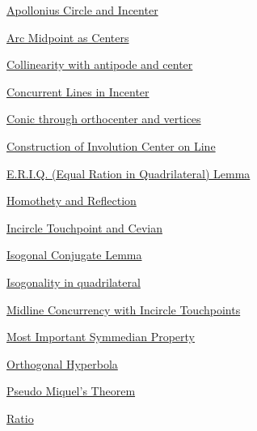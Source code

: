 \hyperref  [lemma:]{}

\hyperref  [lemma:]{}

\hyperref  [lemma:]{}

\hyperref  [lemma:]{}

\hyperref  [lemma:]{}

\hyperref  [lemma:]{}

\hyperref  [lemma:]{}

\hyperref  [lemma:]{}

\hyperref  [lemma:]{}

\hyperref  [lemma:]{}

\hyperref  [lemma:]{}

\hyperref  [lemma:Apollonius Circle and Incenter]{Apollonius Circle and Incenter}

\hyperref  [lemma:Arc Midpoint as Centers]{Arc Midpoint as Centers}

\hyperref  [lemma:Collinearity with antipode and center]{Collinearity with antipode and center}

\hyperref  [lemma:Concurrent Lines in Incenter]{Concurrent Lines in Incenter}

\hyperref  [lemma:Conic through orthocenter and vertices]{Conic through orthocenter and vertices}

\hyperref  [lemma:Construction of Involution Center on Line]{Construction of Involution Center on Line}

\hyperref  [lemma:E.R.I.Q. (Equal Ration in Quadrilateral) Lemma]{E.R.I.Q. (Equal Ration in Quadrilateral) Lemma}

\hyperref  [lemma:Homothety and Reflection]{Homothety and Reflection}

\hyperref  [lemma:Incircle Touchpoint and Cevian]{Incircle Touchpoint and Cevian}

\hyperref  [lemma:Isogonal Conjugate Lemma]{Isogonal Conjugate Lemma}

\hyperref  [lemma:Isogonality in quadrilateral]{Isogonality in quadrilateral}

\hyperref  [lemma:Midline Concurrency with Incircle Touchpoints]{Midline Concurrency with Incircle Touchpoints}

\hyperref  [lemma:Most Important Symmedian Property]{Most Important Symmedian Property}

\hyperref  [lemma:Orthogonal Hyperbola]{Orthogonal Hyperbola}

\hyperref  [lemma:Pseudo Miquel's Theorem]{Pseudo Miquel's Theorem}

\hyperref  [lemma:Ratio]{Ratio}

